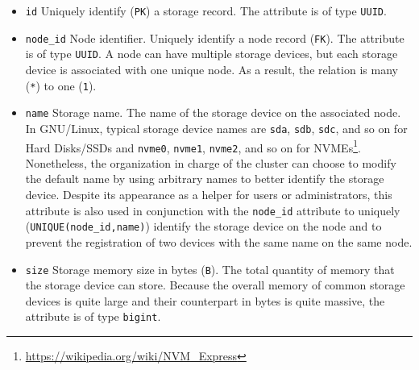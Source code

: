 \begin{itemize}
  \item \texttt{id}
    \newline
    Uniquely identify (\texttt{PK}) a storage record.
    \newline
    The attribute is of type \texttt{UUID}.

  \item \texttt{node\_id}
    \newline
    Node identifier.
    \newline
    Uniquely identify a node record (\texttt{FK}).
    \newline
    The attribute is of type \texttt{UUID}.
    \newline
    A node can have multiple storage devices, but each storage device is
    associated with one unique node. As a result, the relation is many (\texttt{*})
    to one (\texttt{1}).

  \item \texttt{name}
    \newline
    Storage name.
    \newline
    The name of the storage device on the associated node. In GNU/Linux, typical
    storage device names are \texttt{sda}, \texttt{sdb}, \texttt{sdc}, and so on
    for Hard Disks/SSDs and \texttt{nvme0}, \texttt{nvme1}, \texttt{nvme2}, and so
    on for NVMEs\footnote{\url{https://wikipedia.org/wiki/NVM_Express}}.
    Nonetheless, the organization in charge of the cluster can choose to modify the
    default name by using arbitrary names to better identify the storage device.
    \newline
    Despite its appearance as a helper for users or administrators, this attribute
    is also used in conjunction with the \texttt{node\_id} attribute to uniquely
    (\texttt{UNIQUE(node\_id,name)}) identify the storage device on the node and
    to prevent the registration of two devices with the same name on the same
    node.

  \item \texttt{size}
    \newline
    Storage memory size in bytes (\texttt{B}).
    \newline
    The total quantity of memory that the storage device can store.
    \newline
    Because the overall memory of common storage devices is quite large and their
    counterpart in bytes is quite massive, the attribute is of type \texttt{bigint}.


\end{itemize}
